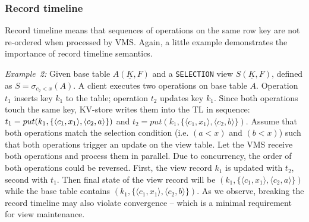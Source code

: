 %

\subsubsection{Record timeline}
\label{subsubsec:record_timeline} 

Record timeline means that sequences of operations on the same row key are not re-ordered 
when processed by VMS.  Again, a little example demonstrates the
importance of record timeline semantics.

\noindent
\textit{Example~2:} Given base table $A(\underline{K}, F)$ and a 
\texttt{SELECTION} view $S(\underline{K}, F)$, defined as 
$S=\sigma_{c_2 < x}(A)$. A client 
executes two operations on base table $A$. Operation $t_1$ inserts key 
$k_1$ to the table; operation $t_2$ updates key $k_1$. Since both operations
touch the same key, KV-store writes them into the TL in sequence: 
$t_1=put(k_1,\{\langle c_1,x_1\rangle, \linebreak\langle c_2,a\rangle\})$ and 
$t_2=put(k_1, \{\langle c_1,x_1 \rangle, \langle c_2,b\rangle\})$. Assume 
that both operations match the selection condition (i.e. $(a < x)$ and $(b < x)$) 
such that both operations trigger an update on the view table. Let 
the VMS receive both operations and process them in parallel. Due to  
concurrency, the order of both operations could be reversed. First, the
view record $k_1$ is updated with $t_2$, second with $t_1$. Then final
state of the view record will be  $(k_1, \{\langle c_1,x_1 \rangle,\langle 
c_2,a\rangle\})$ while the base table contains $(k_1, \{\langle c_1,x_1 \rangle,\langle 
c_2,b\rangle\})$. As we observe, breaking the record timeline may also 
violate convergence -- which is a minimal requirement for view maintenance. 


